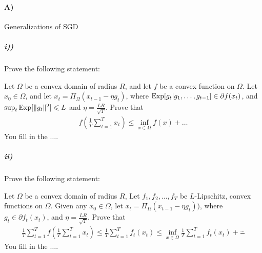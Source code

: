 \documentclass[12pt]{article}
\begin{document}
\paragraph{A)} Generalizations of SGD
\subparagraph{i))} Prove the following statement:
\begin{proposition*} Let $\Omega$ be a convex domain of radius $R$, and let $f$ be a convex function on $\Omega$. Let $x_0 \in \Omega$, and let $x_{t} = \Pi_{\Omega}(x_{t-1} - \eta g_t )$, where $\mathrm{Exp}[g_t | g_1,\dots,g_{t-1}] \in \partial f(x_t)$, and $\sup_{t} \mathrm{Exp}[\|g_t\|^2] \leqslant L$ and $\eta = \frac{LR}{\sqrt{T}}$.  Prove that 
\begin{eqnarray}
 f(\frac{1}{T}\sum_{t=1}^T x_t) \le \inf_{x \in \Omega} f(x) + \dots
\end{eqnarray}
You fill in the $\dots$.
\end{proposition*}
\subparagraph{ii)} Prove the following statement:
\begin{proposition*}  Let $\Omega$ be a convex domain of radius $R$, Let $f_1,f_2,\dots,f_T$ be $L$-Lipschitz, convex functions on $\Omega$. Given any $x_0 \in \Omega$, let $x_{t} = \Pi_{\Omega}(x_{t-1} - \eta g_t ))$, where $g_t \in \partial f_t(x_t)$, and  $\eta = \frac{LR}{\sqrt{T}}$. Prove that
\begin{eqnarray}
\frac{1}{T}\sum_{t=1}^{T} f(\frac{1}{T}\sum_{t=1}^T x_t) \le \frac{1}{T}\sum_{t=1}^Tf_t(x_t) \le \inf_{x \in \Omega}\frac{1}{T}\sum_{t=1}^Tf_t(x_t) + \frac{\dots}{}
\end{eqnarray}
You fill in the $\dots$.
\end{proposition*}
\end{document}
